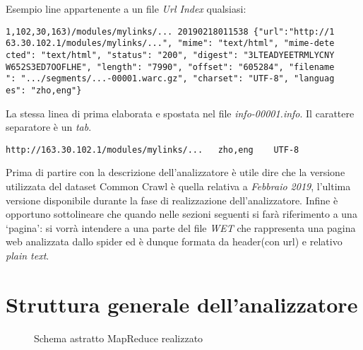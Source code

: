 \documentclass{article}
\newcommand{\MR}{MapReduce}
\newcommand{\WET}{\textit{WET}}
\newcommand{\CC}{Common Crawl}
\newcommand{\pt}{\textit{plain text}}
\newcommand{\filename}[1]{\textit{#1}}
\begin{document}
Esempio line appartenente a un file \textit{Url Index} qualsiasi:
\begin{verbatim}
1,102,30,163)/modules/mylinks/... 20190218011538 {"url":"http://1
63.30.102.1/modules/mylinks/...", "mime": "text/html", "mime-dete
cted": "text/html", "status": "200", "digest": "3LTEADYEETRMLYCNY
W652S3ED7OOFLHE", "length": "7990", "offset": "605284", "filename
": ".../segments/...-00001.warc.gz", "charset": "UTF-8", "languag
es": "zho,eng"}
\end{verbatim}
La stessa linea di prima elaborata e spostata nel file \filename{info-00001.info}. Il carattere separatore è un \textit{tab}.
\begin{verbatim}
http://163.30.102.1/modules/mylinks/...   zho,eng    UTF-8 
\end{verbatim}

Prima di partire con la descrizione dell'analizzatore è utile dire che la versione utilizzata del dataset \CC{} è quella relativa a \textit{Febbraio 2019}, l'ultima versione disponibile durante la fase di realizzazione dell'analizzatore. Infine è opportuno sottolineare che quando nelle sezioni seguenti si farà riferimento a una `pagina': si vorrà intendere  a una parte del file \WET{} che rappresenta una pagina web analizzata dallo spider ed è dunque formata da header(con url) e relativo \pt{}.

\section{Struttura generale dell'analizzatore}

\begin{figure}[H]
  \centering
  
  \caption{Schema astratto \MR{} realizzato}
\end{figure}
\end{document}
